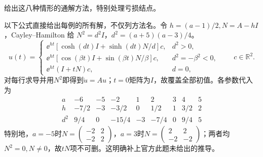 \begin{solution}
(0.40494,-1.67948) (0.30707,-1.61895) (0.18171,-1.54826) (0.02012,-1.46409) (-0.18919,-1.36202) (-0.46137,-1.23628) (-0.81632,-1.07925) (-1.28023,-0.88093) (-1.88760,-0.62814) (-2.68378,-0.30354)};\end{axis}\end{tikzpicture}\end{center}
\par\noindent{\small 依据：官方译审并补证（AI辅助）。}
\end{solution}

\begin{exercise}\label{cw:rec23-4}
给出这八种情形的通解方法，特别处理亏损结点。
\end{exercise}
\begin{solution}
以下公式直接给出每例的所有解，不仅列方法名。令 $h=(a-1)/2,N=A-hI$，Cayley--Hamilton 给 $N^2=d^2I$，$d^2=(a+5)(a-3)/4$。
\[
 u(t)=\begin{cases}
 \ee^{ht}[\cosh(dt)I+\sinh(dt)N/d]c,&d^2>0,\\
 \ee^{ht}[\cos(\beta t)I+\sin(\beta t)N/\beta]c,&d^2=-\beta^2<0,\\
 \ee^{ht}(I+tN)c,&d=0,
 \end{cases}\qquad c\in\mathbb R^2.
\]
对每行求导并用$N^2$即得到$\dot u=Au$；$t=0$矩阵为$I$，故覆盖全部初值。各参数代入为
\[\begin{array}{c|rrrrrrrr}a&-6&-5&-2&1&2&3&4&5\\\hline h&-7/2&-3&-3/2&0&1/2&1&3/2&2\\ d^2&9/4&0&-15/4&-3&-7/4&0&9/4&5\end{array}\]
特别地，$a=-5$时$N=\begin{pmatrix}-2&2\\-2&2\end{pmatrix}$，$a=3$时$N=\begin{pmatrix}2&2\\-2&-2\end{pmatrix}$；两者均$N^2=0,N\ne0$，故$tN$项不可删。这明确补上官方此题未给出的推导。
\par{}
\end{solution}

